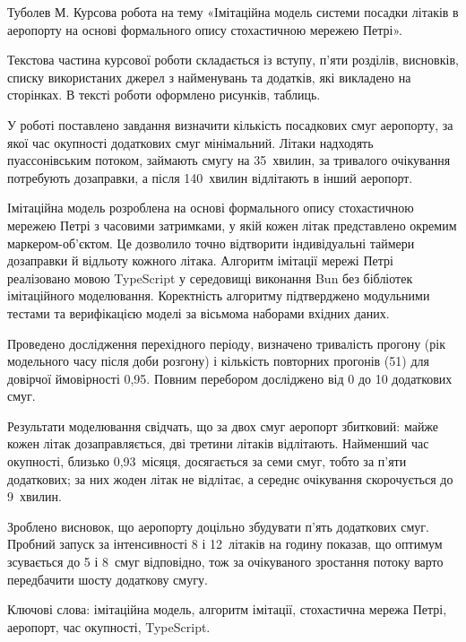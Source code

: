 
Туболев М. Курсова робота на тему «Імітаційна модель системи посадки літаків в аеропорту на основі формального опису стохастичною мережею Петрі».

Текстова частина курсової роботи складається із вступу, п'яти розділів, висновків, списку використаних джерел з  найменувань та  додатків, які викладено на  сторінках. В тексті роботи оформлено  рисунків,  таблиць.

У роботі поставлено завдання визначити кількість посадкових смуг аеропорту, за якої час окупності додаткових смуг мінімальний. Літаки надходять пуассонівським потоком, займають смугу на 35~хвилин, за тривалого очікування потребують дозаправки, а після 140~хвилин відлітають в інший аеропорт.

Імітаційна модель розроблена на основі формального опису стохастичною мережею Петрі з часовими затримками, у якій кожен літак представлено окремим маркером-об'єктом. Це дозволило точно відтворити індивідуальні таймери дозаправки й відльоту кожного літака. Алгоритм імітації мережі Петрі реалізовано мовою TypeScript у середовищі виконання Bun без бібліотек імітаційного моделювання. Коректність алгоритму підтверджено модульними тестами та верифікацією моделі за вісьмома наборами вхідних даних.

Проведено дослідження перехідного періоду, визначено тривалість прогону (рік модельного часу після доби розгону) і кількість повторних прогонів (51) для довірчої ймовірності 0,95. Повним перебором досліджено від 0 до 10 додаткових смуг.

Результати моделювання свідчать, що за двох смуг аеропорт збитковий: майже кожен літак дозаправляється, дві третини літаків відлітають. Найменший час окупності, близько 0,93~місяця, досягається за семи смуг, тобто за п'яти додаткових; за них жоден літак не відлітає, а середнє очікування скорочується до 9~хвилин.

Зроблено висновок, що аеропорту доцільно збудувати п'ять додаткових смуг. Пробний запуск за інтенсивності 8 і 12~літаків на годину показав, що оптимум зсувається до 5 і 8~смуг відповідно, тож за очікуваного зростання потоку варто передбачити шосту додаткову смугу.

Ключові слова: імітаційна модель, алгоритм імітації, стохастична мережа Петрі, аеропорт, час окупності, TypeScript.
